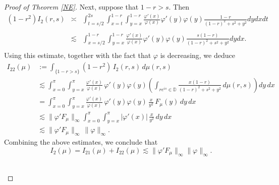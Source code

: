 \documentclass[12pt,reqno,a4paper]{amsart}
\newcommand\DD{\mathbb{D}}
\numberwithin{equation}{section}
\begin{document}
\begin{proof}[Proof of Theorem \ref{NE}]
		\noindent Next, suppose that  $1-r> s$. Then 
		\[
		\begin{array}{lll}
			(1-r^2)I_2(r,s) & \asymp & \displaystyle \int _{t=s/2}^{2s}  \displaystyle \int _{x =t}^{1-r}   \displaystyle \int _{y= x}^{1-r}\frac{\varphi'(x)}{\varphi(x)}\varphi'(y)\varphi(y)\frac{1-r}{(1-r)^2+s^2+y^2}dydxdt\\
			\\
			& \lesssim & \displaystyle \int _{x =s/2}^{1-r}   \displaystyle \int _{y= x}^{1-r}\frac{\varphi'(x)}{\varphi(x)}\varphi'(y)\varphi(y)\frac{s(1-r)}{(1-r)^2+s^2+y^2}dydx.\\
		\end{array}
		\]
		Using this estimate, together with the fact that $\varphi$ is decreasing, we deduce 
		\begin{align*}
			I_{22}(\mu)
			&:= \int_{\{1-r> s\}} (1-r^2)\, I_2(r,s)\, d\mu(r,s)
			\\
			&\lesssim \int_{x=0}^{ \pi} \int_{y=x}^{ \pi}
			\frac{\varphi'(x)}{\varphi(x)}\, \varphi'(y)\varphi(y)
			\left(\int_{re^{is}\in \DD} \frac{x(1-r)}{(1-r)^2+s^2+y^2}\, d\mu(r,s)\right)
			dy\,dx
			\\ 
			&= \int_{x=0}^{ \pi} \int_{y=x}^{ \pi}
			\frac{\varphi'(x)}{\varphi(x)}\, \varphi'(y)\varphi(y)\,
			\frac{x}{y^2}\, F_\mu(y)\, dy\,dx
			\\ 
			&\lesssim \|\varphi' F_\mu\|_\infty
			\int_{x=0}^{ \pi} \int_{y=x}^{ \pi}
			\vert\varphi'(x)\vert\,\frac{x}{y^2}\, dy\,dx
			\\ 
			&\lesssim \|\varphi' F_\mu\|_\infty \,\|\varphi\|_\infty.
		\end{align*}
		Combining the above estimates, we conclude that 
		$$
		I_2(\mu) =I_{21}(\mu)+I_{22}(\mu)  \lesssim  \|\varphi'F_\mu\|_\infty \|\varphi\|_\infty.
		$$
		
		\\
		

\end{proof}
\end{document}
